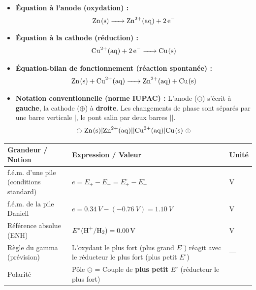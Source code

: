 \documentclass[11pt]{article}
\begin{document}
\begin{propriete}
\begin{itemize}
  \item \textbf{Équation à l'anode (oxydation) :} \[ \ce{Zn(s) -> Zn^2+(aq) + 2e-} \]
  \item \textbf{Équation à la cathode (réduction) :} \[ \ce{Cu^2+(aq) + 2e- -> Cu(s)} \]
  \item \textbf{Équation-bilan de fonctionnement (réaction spontanée) :} \[ \ce{Zn(s) + Cu^2+(aq) -> Zn^2+(aq) + Cu(s)} \]
  \item \textbf{Notation conventionnelle (norme IUPAC) :} L'anode ($\ominus$) s'écrit à \textbf{gauche}, la cathode ($\oplus$) à \textbf{droite}. Les changements de phase sont séparés par une barre verticale $|$, le pont salin par deux barres $||$.
  \[ \ominus\ \ce{Zn(s)}|\ce{Zn^2+(aq)}||\ce{Cu^2+(aq)}|\ce{Cu(s)}\ \oplus \]
\end{itemize}
\end{propriete}

\begin{propriete}
\begin{center}
\begin{tabularx}{\linewidth}{|l|X|l|}
\hline
\rowcolor{popblueL} \textbf{Grandeur / Notion} & \textbf{Expression / Valeur} & \textbf{Unité} \\
\hline
f.é.m. d'une pile (conditions standard) & $e = E_{+} - E_{-} = E^\circ_{+} - E^\circ_{-}$ & V \\
\hline
f.é.m. de la pile Daniell & $e = \SI{0,34}{V} - (-\SI{0,76}{V}) = \SI{1,10}{V}$ & V \\
\hline
Référence absolue (ENH) & $E^\circ(\ce{H+}/\ce{H2}) = \SI{0,00}{V}$ & V \\
\hline
Règle du gamma (prévision) & L'oxydant le plus fort (plus grand $E^\circ$) réagit avec le réducteur le plus fort (plus petit $E^\circ$) & --- \\
\hline
Polarité & Pôle $\ominus$ = Couple de \textbf{plus petit} $E^\circ$ (réducteur le plus fort) & --- \\
\hline
\end{tabularx}
\end{center}
\end{propriete}
\end{document}
